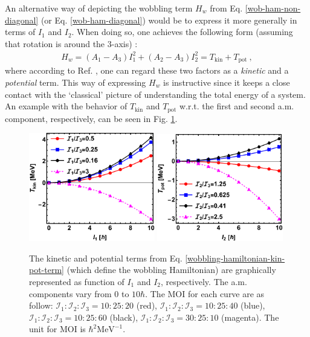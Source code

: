 An alternative way of depicting the wobbling term $H_w$ from Eq. \ref{wob-ham-non-diagonal} (or Eq. \ref{wob-ham-diagonal}) would be to express it more generally in terms of $I_1$ and $I_2$. When doing so, one achieves the following form (assuming that rotation is around the $3$-axis) \cite{oi2006semi}:
\begin{align}
    H_w=(A_1-A_3)I_1^2+(A_2-A_3)I_2^2=T_\text{kin}+T_\text{pot}\ ,
    \label{wobbling-hamiltonian-kin-pot-term}
\end{align}
where according to Ref. \cite{wen2015wobbling}, one can regard these two factors as a \emph{kinetic} and a \emph{potential} term. This way of expressing $H_w$ is instructive since it keeps a close contact with the `classical' picture of understanding the total energy of a system. An example with the behavior of $T_\text{kin}$ and $T_\text{pot}$ w.r.t. the first and second a.m. component, respectively, can be seen in Fig. \ref{kin-pot-wobbling-ham-example}.
\begin{figure}
    \centering
    \includegraphics[width=0.49\textwidth]{Chapters/Figures/kin-pot-terms.pdf}
    \includegraphics[width=0.49\textwidth]{Chapters/Figures/kin-pot-terms-2.pdf}
    \caption{The kinetic and potential terms from Eq. \ref{wobbling-hamiltonian-kin-pot-term} (which define the wobbling Hamiltonian) are graphically represented as function of $I_1$ and $I_2$, respectively. The a.m. components vary from $0$ to $10\hbar$. The MOI for each curve are as follow: $\mathcal{I}_1:\mathcal{I}_2:\mathcal{I}_3=10:25:20$ (red), $\mathcal{I}_1:\mathcal{I}_2:\mathcal{I}_3=10:25:40$ (blue), $\mathcal{I}_1:\mathcal{I}_2:\mathcal{I}_3=10:25:60$ (black), $\mathcal{I}_1:\mathcal{I}_2:\mathcal{I}_3=30:25:10$ (magenta). The unit for MOI is $\hbar^2\text{MeV}^{-1}$.}
    \label{kin-pot-wobbling-ham-example}
\end{figure}

